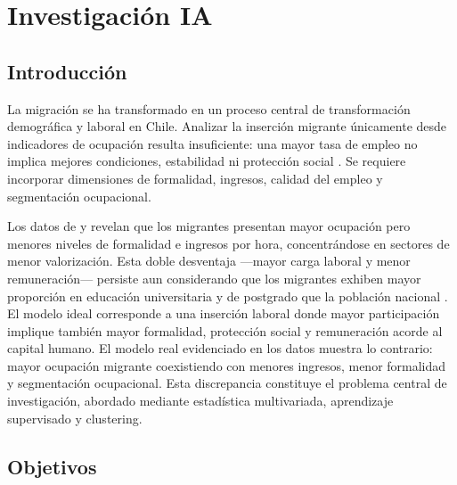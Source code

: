 \rhead{\newtitle}
\cfoot{\thepage}
\renewcommand{\headrulewidth}{1pt}
\renewcommand{\footrulewidth}{1pt}
\chapter{Investigación IA}

\section{Introducción}

La migración se ha transformado en un proceso central de transformación demográfica y laboral en Chile. Analizar la inserción migrante únicamente desde indicadores de ocupación resulta insuficiente: una mayor tasa de empleo no implica mejores condiciones, estabilidad ni protección social \citep{lamas_aicon_ambitos_2024}. Se requiere incorporar dimensiones de formalidad, ingresos, calidad del empleo y segmentación ocupacional.

Los datos de \citet{ENE2024} y \citet{CASEN2024} revelan que los migrantes presentan mayor ocupación pero menores niveles de formalidad e ingresos por hora, concentrándose en sectores de menor valorización. Esta doble desventaja —mayor carga laboral y menor remuneración— persiste aun considerando que los migrantes exhiben mayor proporción en educación universitaria y de postgrado que la población nacional \citep{noauthor_mirada_nodate}. El modelo ideal corresponde a una inserción laboral donde mayor participación implique también mayor formalidad, protección social y remuneración acorde al capital humano. El modelo real evidenciado en los datos muestra lo contrario: mayor ocupación migrante coexistiendo con menores ingresos, menor formalidad y segmentación ocupacional. Esta discrepancia constituye el problema central de investigación, abordado mediante estadística multivariada, aprendizaje supervisado y clustering.



\section{Objetivos}

